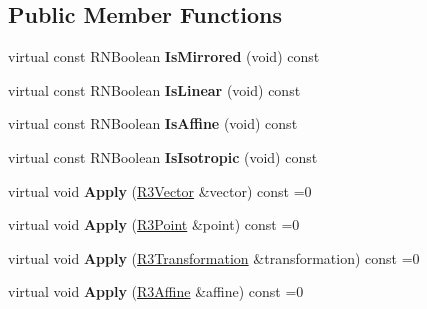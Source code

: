 \subsection*{Public Member Functions}
\begin{DoxyCompactItemize}
\item 
virtual const R\+N\+Boolean {\bfseries Is\+Mirrored} (void) const \hypertarget{class_r3_transformation_a02567b2778174d98cd617abb6ed7d9b4}{}\label{class_r3_transformation_a02567b2778174d98cd617abb6ed7d9b4}

\item 
virtual const R\+N\+Boolean {\bfseries Is\+Linear} (void) const \hypertarget{class_r3_transformation_a1e89e187e8b63f05a0ee6dfc835aa8ab}{}\label{class_r3_transformation_a1e89e187e8b63f05a0ee6dfc835aa8ab}

\item 
virtual const R\+N\+Boolean {\bfseries Is\+Affine} (void) const \hypertarget{class_r3_transformation_a85059c0b5b40a62ce97c92a957ffc844}{}\label{class_r3_transformation_a85059c0b5b40a62ce97c92a957ffc844}

\item 
virtual const R\+N\+Boolean {\bfseries Is\+Isotropic} (void) const \hypertarget{class_r3_transformation_af0690239eae5c267eff275d35acd4e44}{}\label{class_r3_transformation_af0690239eae5c267eff275d35acd4e44}

\item 
virtual void {\bfseries Apply} (\hyperlink{class_r3_vector}{R3\+Vector} \&vector) const  =0\hypertarget{class_r3_transformation_aca1a29ad882a1eebcd779df887a65eaa}{}\label{class_r3_transformation_aca1a29ad882a1eebcd779df887a65eaa}

\item 
virtual void {\bfseries Apply} (\hyperlink{class_r3_point}{R3\+Point} \&point) const  =0\hypertarget{class_r3_transformation_a53942ad60b39d77749be3c966db67a77}{}\label{class_r3_transformation_a53942ad60b39d77749be3c966db67a77}

\item 
virtual void {\bfseries Apply} (\hyperlink{class_r3_transformation}{R3\+Transformation} \&transformation) const  =0\hypertarget{class_r3_transformation_a47f7e751acd461363a7b31bfe6062199}{}\label{class_r3_transformation_a47f7e751acd461363a7b31bfe6062199}

\item 
virtual void {\bfseries Apply} (\hyperlink{class_r3_affine}{R3\+Affine} \&affine) const  =0\hypertarget{class_r3_transformation_a56e01a4f3d12f254192dacf340ced6cd}{}\label{class_r3_transformation_a56e01a4f3d12f254192dacf340ced6cd}


\end{DoxyCompactItemize}
